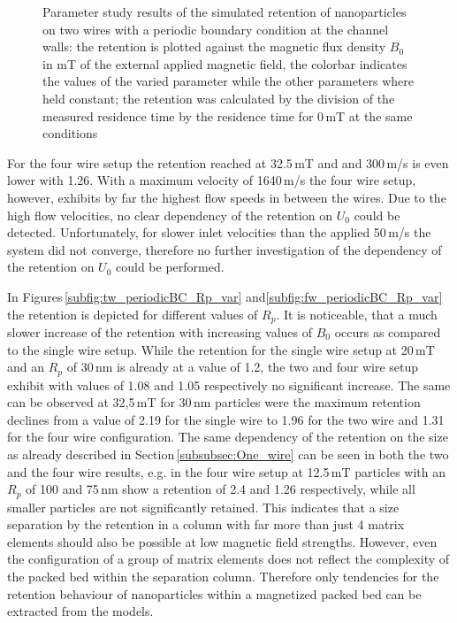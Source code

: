 \begin{figure}[H]
        \caption[Parameter study results of the simulated retention of nanoparticles on two wires with a periodic boundary condition at the channel walls]{Parameter study results of the simulated retention of nanoparticles on two wires with a periodic boundary condition at the channel walls: the retention is plotted against the magnetic flux density $B_{0}$ in mT of the external applied magnetic field, the colorbar indicates the values of the varied parameter while the other parameters where held constant; the retention was calculated by the division of the measured residence time by the residence time for 0\,mT at the same conditions }
        \label{fig:tw_param_res_periodicBC}
  \end{figure}

 For the four wire setup the retention reached at 32.5\,mT and and 300\,\textmu m/s is even lower with 1.26. With a maximum velocity of 1640\,\textmu m/s the four wire setup, however, exhibits by far the highest flow speeds in between the wires. Due to the high flow velocities, no clear dependency of the retention on $U_{0}$ could be detected. Unfortunately, for slower inlet velocities than the applied 50\,\textmu m/s the system did not converge, therefore no further investigation of the dependency of the retention on $U_{0}$ could be performed.
 
 In Figures\,\ref{subfig:tw_periodicBC_Rp_var} and\ref{subfig:fw_periodicBC_Rp_var} the retention is depicted for different values of $R_{p}$. It is noticeable, that a much slower increase of the retention with increasing values of $B_{0}$ occurs as compared to the single wire setup. While the retention for the single wire setup at 20\,mT and an $R_{p}$ of 30\,nm is already at a value of 1.2, the two and four wire setup exhibit with values of 1.08 and 1.05 respectively no significant increase. The same can be observed at 32,5\,mT for 30\,nm particles were the maximum retention declines from a value of 2.19 for the single wire to 1.96 for the two wire and 1.31 for the four wire configuration. The same dependency of the retention on the size as already described in Section\,\ref{subsubsec:One_wire} can be seen in both the two and the four wire results, e.g. in the four wire setup at 12.5\,mT particles with an $R_{p}$ of 100 and 75\,nm show a retention of 2.4 and 1.26 respectively, while all smaller particles are not significantly retained. This indicates that a size separation by the retention in a column with far more than just 4 matrix elements should also be possible at low magnetic field strengths. However, even the configuration of a group of matrix elements does not reflect the complexity of the packed bed within the separation column. Therefore only tendencies for the retention behaviour of nanoparticles within a magnetized packed bed can be extracted from the models. 

